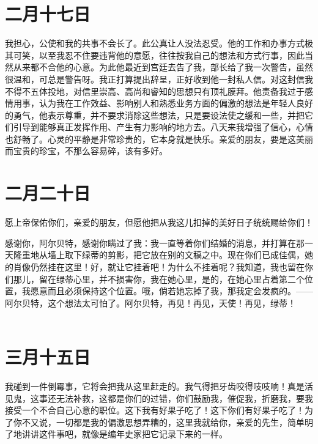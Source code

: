 \documentclass[12pt,oneside]{book}
\begin{document}
\chapter{二月十七日}
我担心，公使和我的共事不会长了。此公真让人没法忍受。他的工作和办事方式极其可笑，以至我忍不住要违背他的意愿，往往按我自己的想法和方式行事，因此当然从来都不合他的心意。为此他最近到宫廷去告了我，部长给了我一次警告，虽然很温和，可总是警告呀。我正打算提出辞呈，正好收到他一封私人信。对这封信我不得不五体投地，对信里崇高、高尚和睿知的思想只有顶礼膜拜。他责备我过于感情用事，认为我在工作效益、影响别人和熟悉业务方面的偏激的想法是年轻人良好的勇气，他表示尊重，并不要求消除这些想法，只是要设法使之缓和一些，并把它们引导到能够真正发挥作用、产生有力影响的地方去。八天来我增强了信心，心情也舒畅了。心灵的平静是非常珍贵的，它本身就是快乐。亲爱的朋友，要是这美丽而宝贵的珍宝，不那么容易碎，该有多好。
　　

\chapter{二月二十日}
愿上帝保佑你们，亲爱的朋友，但愿他把从我这儿扣掉的美好日子统统赐给你们！

感谢你，阿尔贝特，感谢你瞒过了我：我一直等着你们结婚的消息，并打算在那一天隆重地从墙上取下绿蒂的剪影，把它放在别的文稿之中。现在你们已成佳偶，她的肖像仍然挂在这里！好，就让它挂着吧！为什么不挂着呢？我知道，我也留在你们那儿，留在绿蒂心里，并不损害你，我在她心里，是的，在她心里占着第二个位置，我愿意而且必须保持这个位置。哦，倘若她忘掉了我，那我定会发疯的。——阿尔贝特，这个想法太可怕了。阿尔贝特，再见！再见，天使！再见，绿蒂！
　　

\chapter{三月十五日}
我碰到一件倒霉事，它将会把我从这里赶走的。我气得把牙齿咬得吱吱响！真是活见鬼，这事还无法补救，这都是你们的过错，你们鼓励我，催促我，折磨我，要我接受一个不合自己心意的职位。这下我有好果子吃了！这下你们有好果子吃了！为了你不又说，一切都是我的偏激思想弄糟的，这里我就给你，亲爱的先生，简单明了地讲讲这件事吧，就像是编年史家把它记录下来的一样。
\end{document}
